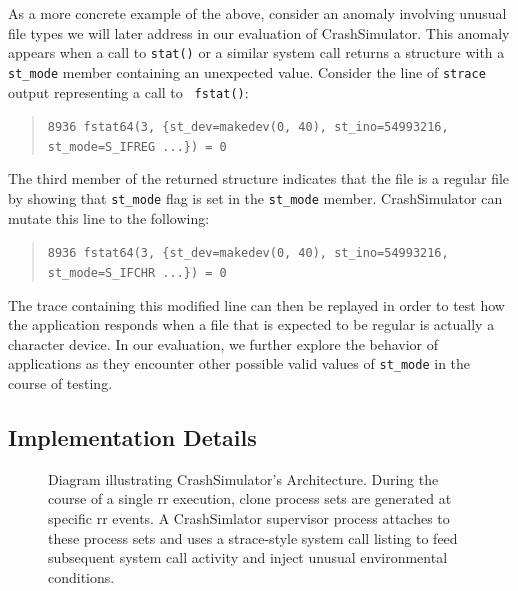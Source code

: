 As a more concrete example of the above, consider an anomaly
involving unusual file types we will later address in our evaluation of
CrashSimulator.  This anomaly appears when a call to {\tt stat()} or a similar system
call returns a structure with a {\tt st\_mode} member containing an unexpected
value. Consider the line of {\tt strace} output representing a call to {\tt
  fstat()}:
\begin{quote}
  {\tt 8936  fstat64(3, \{st\_dev=makedev(0, 40), st\_ino=54993216, st\_mode=S\_IFREG ...\}) = 0}
\end{quote}
The third member of the returned structure indicates that the file is a
regular file by showing that {\tt st\_mode} flag is set in the {\tt st\_mode}
member.  CrashSimulator can mutate this  line to the following:

\begin{quote}
  {\tt 8936  fstat64(3, \{st\_dev=makedev(0, 40), st\_ino=54993216, st\_mode=S\_IFCHR ...\}) = 0}
\end{quote}

The trace containing this modified line can then be replayed in order to
test how the application responds when a file that is expected to be
regular is actually a character device. In our evaluation, we further
explore the behavior of applications as they encounter other possible valid
values of {\tt st\_mode} in the course of testing.

\subsection{Implementation Details}
\label{SEC:architecture}

\begin{figure}[t]
  \center{}
  \caption{Diagram illustrating CrashSimulator's Architecture.  During the
    course of a single rr execution, clone process sets are generated at
    specific rr events.  A CrashSimlator supervisor process attaches to
    these process sets and uses a strace-style system call listing to feed
    subsequent system call activity and inject unusual environmental
    conditions.}
  \label{figure:architecture}
\end{figure}

